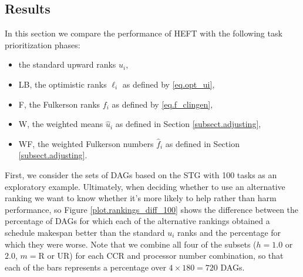 \documentclass[12pt]{article}
\begin{document}
\subsection{Results}
\label{subsect.evaluation}

In this section we compare the performance of HEFT with the following task prioritization phases:
\begin{itemize}
	\item the standard upward ranks $u_i$,
	\item LB, the optimistic ranks $\ell_i$ as defined by \eqref{eq.opt_ui},
	\item F, the Fulkerson ranks $f_i$ as defined by \eqref{eq.f_clingen},
	\item W, the weighted means $\hat{u}_i$ as defined in Section \ref{subsect.adjusting},
	\item WF, the weighted Fulkerson numbers $\hat{f}_i$ as defined in Section \ref{subsect.adjusting}.
\end{itemize}
First, we consider the sets of DAGs based on the STG with 100 tasks as an exploratory example. Ultimately, when deciding whether to use an alternative ranking we want to know whether it's more likely to help rather than harm performance, so Figure \ref{plot.rankings_diff_100} shows the difference between the percentage of DAGs for which each of the alternative rankings obtained a schedule makespan better than the standard $u_i$ ranks and the percentage for which they were worse. Note that we combine all four of the subsets ($h = 1.0$ or $2.0$, $m = \text{R}$ or UR) for each CCR and processor number combination, so that each of the bars represents a percentage over $4 \times 180 = 720$ DAGs. 
\end{document}
